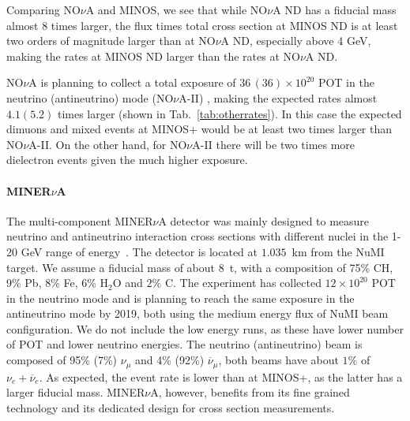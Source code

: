 Comparing NO$\nu$A and MINOS, we see that while NO$\nu$A ND has a fiducial mass almost 8 times larger, the flux times total cross section at MINOS ND is at least two orders of magnitude larger than at NO$\nu$A ND, especially above 4 GeV, making the rates at MINOS ND larger than the rates at NO$\nu$A ND. 
%

NO$\nu$A is planning to collect a total exposure of $36\,(36)\times10^{20}$ POT in the neutrino (antineutrino) mode (NO$\nu$A-II) \cite{sanchez_mayly_2018_1286758,NovaII}, making the expected rates almost $4.1 (5.2)$ times larger (shown in Tab.~\ref{tab:otherrates}). In this case the expected dimuons and mixed events at MINOS+ would be at least two times larger than NO$\nu$A-II. On the other hand, for NO$\nu$A-II there will be two times more dielectron events given the much higher exposure. 

\paragraph{MINER$\nu$A} The multi-component MINER$\nu$A detector was mainly designed to measure neutrino and antineutrino interaction cross sections with different nuclei in the 1-20 GeV range of energy~\cite{MINERvA:2017}. The detector is located at $1.035$~km from the NuMI target. We assume a fiducial mass of about $8$~t, with a composition of 75\% CH, 9\% Pb, 8\% Fe, 6\% H$_2$O and $2\%$ C. The experiment has collected $12\times10^{20}$ POT in the neutrino mode and is planning to reach the same exposure in the antineutrino mode by 2019, both using the medium energy flux of NuMI beam configuration. We do not include the low energy runs, as these have lower number of POT and lower neutrino energies. The neutrino (antineutrino) beam is composed of 95\% (7\%) $\nu_\mu$ and 
4\% (92\%) $\overline \nu_\mu$, both beams have  about $1\%$ of $\nu_e+\overline\nu_e$. As expected, the event rate is lower than at MINOS+, as the latter has a larger fiducial mass. MINER$\nu$A, however, benefits from its fine grained technology and its dedicated design for cross section measurements.

